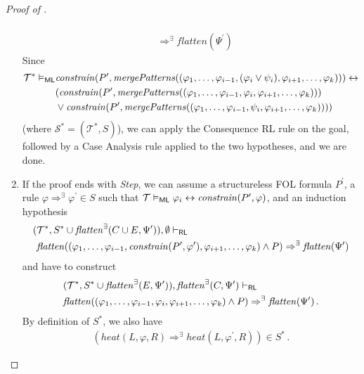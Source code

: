 \begin{proof}[Proof of ]
\begin{enumerate}
\begin{align*}
            \\ & \Rightarrow^\exists
            \mathit{flatten}(\Psi^\prime)
        \end{align*}
        Since
        \begin{align*}
            \mathcal{T}^* \vDash_{\mathsf{ML}} & \mathit{constrain}(P^\prime, \mathit{mergePatterns}((\varphi_1, \ldots, \varphi_{i-1}, (\varphi_i \lor \psi_i), \varphi_{i+1}, \ldots, \varphi_k))) \leftrightarrow \\
            & (\mathit{constrain}(P^\prime, \mathit{mergePatterns}((\varphi_1, \ldots, \varphi_{i-1}, \varphi_i, \varphi_{i+1}, \ldots, \varphi_k))) \\
            & \lor \mathit{constrain}(P^\prime, \mathit{mergePatterns}((\varphi_1, \ldots, \varphi_{i-1}, \psi_i, \varphi_{i+1}, \ldots, \varphi_k))))
        \end{align*}
        (where $\mathcal{S}^* = (\mathcal{T}^*, S)$),
        we can apply the Consequence RL rule on the goal, followed by a Case Analysis rule applied to the two hypotheses, and we are done.
        
    \item If the proof ends with \emph{Step},
      we can assume a structureless FOL formula $P^\prime$, a rule $\varphi \Rightarrow^\exists \varphi^\prime \in S$ such that
      $\mathcal{T} \vDash_{\mathsf{ML}} \varphi_i \leftrightarrow \mathit{constrain}(P^\prime, \varphi)$,
      and an induction hypothesis
      \begin{align*}
        (&\mathcal{T}^*, S^* \cup \mathit{flatten}^\exists(C \cup E, \Psi^\prime)), \emptyset \vdash_{\mathsf{RL}}
          \\ &
          \mathit{flatten}((\varphi_1, \ldots, \varphi_{i-1}, \mathit{constrain}(P^\prime, \varphi^\prime), \varphi_{i+1}, \ldots, \varphi_k) \land P) \Rightarrow^\exists \mathit{flatten}(\Psi^\prime)     
      \end{align*}
      and have to construct
      \begin{align*}
      & (\mathcal{T}^*, S^* \cup \mathit{flatten}^\exists(E, \Psi^\prime)), \mathit{flatten}^\exists(C, \Psi^\prime) \vdash_{\mathsf{RL}} \\
          & \mathit{flatten}((\varphi_1, \ldots, \varphi_{i-1}, \varphi_i, \varphi_{i+1}, \ldots, \varphi_k) \land P) \Rightarrow^\exists \mathit{flatten}(\Psi^\prime)    \, .
      \end{align*}
        By definition of $S^*$, we also have
        \begin{align*}
            (\mathit{heat}(L, \varphi, R) \Rightarrow^\exists \mathit{heat}(L, \varphi^\prime, R)) \in S^* \, .
        \end{align*}
      

\end{enumerate}
\end{proof}

